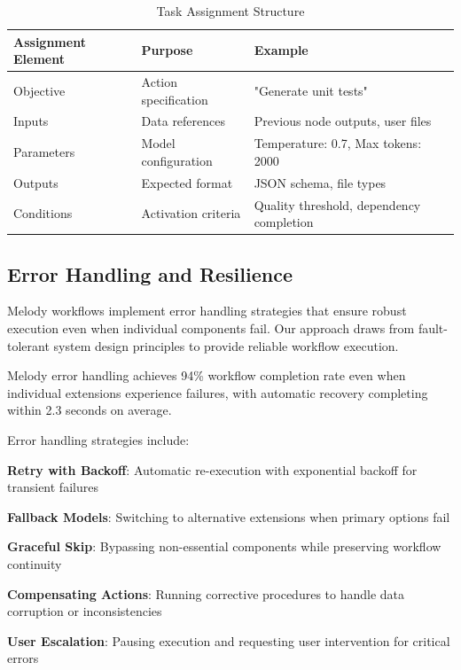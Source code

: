 \begin{table}[ht]
\centering
\begin{tabular}{@{}lll@{}}
\toprule
\textbf{Assignment Element} & \textbf{Purpose} & \textbf{Example} \\
\midrule
Objective & Action specification & "Generate unit tests" \\
Inputs & Data references & Previous node outputs, user files \\
Parameters & Model configuration & Temperature: 0.7, Max tokens: 2000 \\
Outputs & Expected format & JSON schema, file types \\
Conditions & Activation criteria & Quality threshold, dependency completion \\
\bottomrule
\end{tabular}
\caption{Task Assignment Structure}
\end{table}

\subsection*{Error Handling and Resilience}

Melody workflows implement error handling strategies that ensure robust execution even when individual components fail. Our approach draws from fault-tolerant system design principles to provide reliable workflow execution.

\begin{successbox}
Melody error handling achieves 94\% workflow completion rate even when individual extensions experience failures, with automatic recovery completing within 2.3 seconds on average.
\end{successbox}

Error handling strategies include:

\begin{expandedlist}
    \item \textbf{Retry with Backoff}: Automatic re-execution with exponential backoff for transient failures
    \item \textbf{Fallback Models}: Switching to alternative extensions when primary options fail
    \item \textbf{Graceful Skip}: Bypassing non-essential components while preserving workflow continuity
    \item \textbf{Compensating Actions}: Running corrective procedures to handle data corruption or inconsistencies
    \item \textbf{User Escalation}: Pausing execution and requesting user intervention for critical errors
\end{expandedlist}

